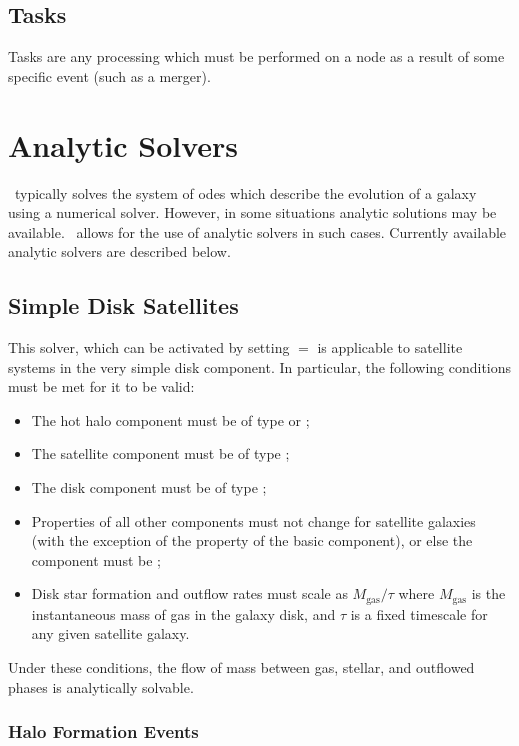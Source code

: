 \subsection{Tasks}

Tasks are any processing which must be performed on a node as a result of some specific event (such as a merger).

\section{Analytic Solvers}

\glc\ typically solves the system of \glspl{ode} which describe the evolution of a galaxy using a numerical solver. However, in some situations analytic solutions may be available. \glc\ allows for the use of analytic solvers in such cases. Currently available analytic solvers are described below.

\subsection{Simple Disk Satellites}

This solver, which can be activated by setting \mono{[diskVerySimpleUseAnalyticSolver]}$=$ is applicable to satellite systems in the very simple disk component. In particular, the following conditions must be met for it to be valid:
\begin{itemize}
\item The hot halo component must be of type  or ;
\item The satellite component must be of type ;
\item The disk component must be of type ;
\item Properties of all other components must not change for satellite galaxies (with the exception of the  property of the basic component), or else the component must be ;
  \item Disk star formation and outflow rates must scale as $M_\mathrm{gas}/\tau$ where $M_\mathrm{gas}$ is the instantaneous mass of gas in the galaxy disk, and $\tau$ is a fixed timescale for any given satellite galaxy.
\end{itemize}
Under these conditions, the flow of mass between gas, stellar, and outflowed phases is analytically solvable.

\subsubsection{Halo Formation Events}\label{sec:HaloFormationEvents}

